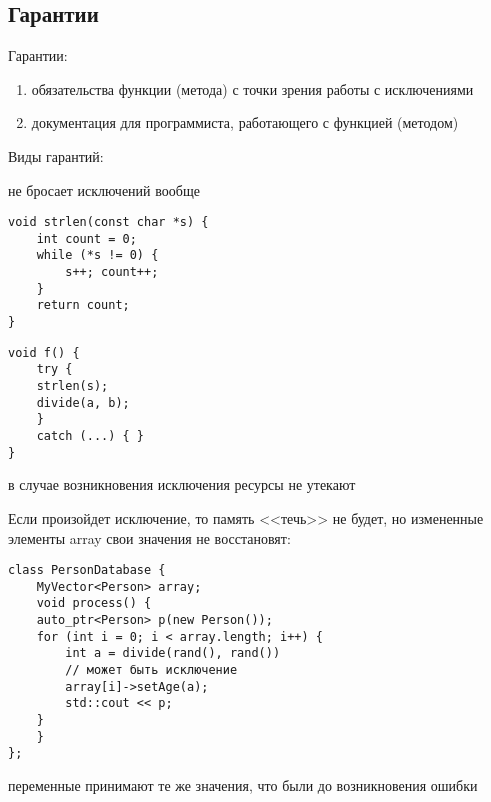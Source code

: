 \subsection{Гарантии}
Гарантии:
\begin{enumerate}[noitemsep]
    \item обязательства функции (метода) с точки зрения работы с исключениями
    \item документация для программиста, работающего с функцией (методом)
\end{enumerate} 
Виды гарантий:
\begin{description}[itemindent=0.5mm,noitemsep]
    \item[no throw guarantee] не бросает исключений вообще

	\begin{minipage}{0.45\textwidth}
	\begin{verbatim}
void strlen(const char *s) {
    int count = 0;
    while (*s != 0) {
        s++; count++;
    }
    return count;
}
	\end{verbatim}
	\end{minipage}
	\hfill
	\begin{minipage}{0.45\textwidth}
	\begin{verbatim}
void f() {
    try {
	strlen(s);
	divide(a, b);
    }
    catch (...) { }
}
	\end{verbatim}
	\end{minipage}

    \item[basic guarantee] в случае возникновения исключения ресурсы не утекают

	\begin{minipage}{0.35\textwidth}
	    Если произойдет исключение, то память <<течь>> не будет, но измененные элементы array свои значения не восстановят:
	\end{minipage}
	\hfill
	\begin{minipage}{0.55\textwidth}
	    \begin{verbatim}
class PersonDatabase {
    MyVector<Person> array;
    void process() {
	auto_ptr<Person> p(new Person());
	for (int i = 0; i < array.length; i++) {
	    int a = divide(rand(), rand())
	    // может быть исключение
	    array[i]->setAge(a);
	    std::cout << p;
	}
    }
};
	    \end{verbatim}
	\end{minipage}
    \item[strong guarantee] переменные принимают те же значения, что были до возникновения ошибки


\end{description}
